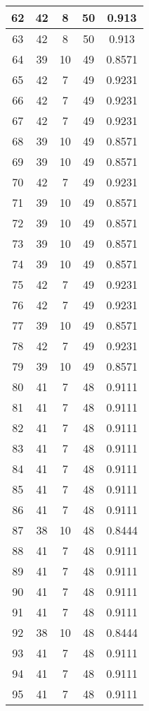 \documentclass[letterpaper, 12pt]{article}
\begin{document}
\begin{longtable}{|c|c|c|c|c|}
\hline
62 & 42 & 8 & 50 & 0.913 \\
\hline
63 & 42 & 8 & 50 & 0.913 \\
\hline
64 & 39 & 10 & 49 & 0.8571 \\
\hline
65 & 42 & 7 & 49 & 0.9231 \\
\hline
66 & 42 & 7 & 49 & 0.9231 \\
\hline
67 & 42 & 7 & 49 & 0.9231 \\
\hline
68 & 39 & 10 & 49 & 0.8571 \\
\hline
69 & 39 & 10 & 49 & 0.8571 \\
\hline
70 & 42 & 7 & 49 & 0.9231 \\
\hline
71 & 39 & 10 & 49 & 0.8571 \\
\hline
72 & 39 & 10 & 49 & 0.8571 \\
\hline
73 & 39 & 10 & 49 & 0.8571 \\
\hline
74 & 39 & 10 & 49 & 0.8571 \\
\hline
75 & 42 & 7 & 49 & 0.9231 \\
\hline
76 & 42 & 7 & 49 & 0.9231 \\
\hline
77 & 39 & 10 & 49 & 0.8571 \\
\hline
78 & 42 & 7 & 49 & 0.9231 \\
\hline
79 & 39 & 10 & 49 & 0.8571 \\
\hline
80 & 41 & 7 & 48 & 0.9111 \\
\hline
81 & 41 & 7 & 48 & 0.9111 \\
\hline
82 & 41 & 7 & 48 & 0.9111 \\
\hline
83 & 41 & 7 & 48 & 0.9111 \\
\hline
84 & 41 & 7 & 48 & 0.9111 \\
\hline
85 & 41 & 7 & 48 & 0.9111 \\
\hline
86 & 41 & 7 & 48 & 0.9111 \\
\hline
87 & 38 & 10 & 48 & 0.8444 \\
\hline
88 & 41 & 7 & 48 & 0.9111 \\
\hline
89 & 41 & 7 & 48 & 0.9111 \\
\hline
90 & 41 & 7 & 48 & 0.9111 \\
\hline
91 & 41 & 7 & 48 & 0.9111 \\
\hline
92 & 38 & 10 & 48 & 0.8444 \\
\hline
93 & 41 & 7 & 48 & 0.9111 \\
\hline
94 & 41 & 7 & 48 & 0.9111 \\
\hline
95 & 41 & 7 & 48 & 0.9111 \\
\hline

\end{longtable}
\end{document}
